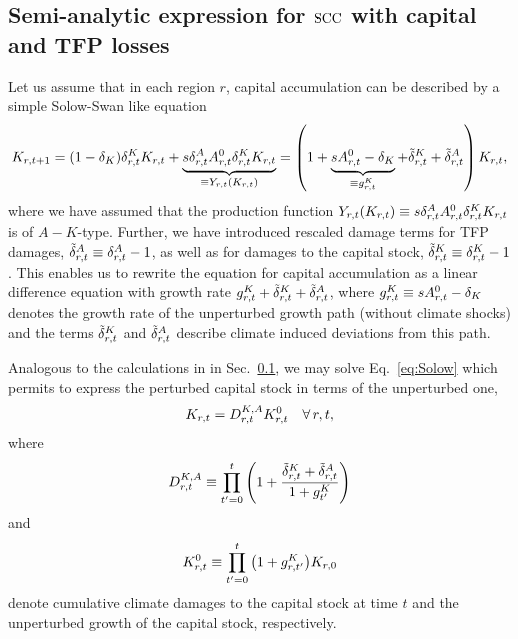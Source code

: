 \documentclass[preprint,3p,authoryear]{elsarticle}
\begin{document}
\subsection{Semi-analytic expression for $\operatorname{SCC}$ with capital and TFP losses}
\label{subsec:analytSCC}
Let us assume that in each region $r$, capital accumulation can be described by a simple Solow-Swan like equation
  \begin{equation}
  \label{eq:Solow}
    K_{r,t+1} = (1-\delta_K)\delta^K_{r,t}K_{r,t}+\underbrace{s\delta^A_{r,t}A^{0}_{r,t}\delta^K_{r,t}K_{r,t}}_{\equiv Y_{r,t}(K_{r,t})}
    = \left(1+\underbrace{sA^{0}_{r,t}-\delta_K}_{\equiv g^{K}_{r,t}} +\tilde{\delta}^K_{r,t}+\tilde{\delta}^A_{r,t}\right)K_{r,t},
  \end{equation}
  where we have assumed that the production function $Y_{r,t}(K_{r,t})\equiv s \delta^A_{r,t}A^{0}_{r,t}\delta^K_{r,t}K_{r,t}$ is of $A-K$-type. Further, we have introduced  rescaled damage terms for TFP damages, $\tilde{\delta}^A_{r,t}\equiv\delta^A_{r,t}-1$, as well as for damages to the capital stock, $\tilde{\delta}^K_{r,t}\equiv\delta^K_{r,t}-1$. This enables us to rewrite the equation for capital accumulation as a linear difference equation with growth rate  $g^{K}_{r,t}+\tilde{\delta}^K_{r,t}+\tilde{\delta}^A_{r,t}$, where $g^{K}_{r,t}\equiv sA^{0}_{r,t}-\delta_K $ denotes the growth rate of the unperturbed growth path (without climate shocks) and the terms $\tilde{\delta}^K_{r,t}$ and $\tilde{\delta}^A_{r,t}$ describe climate induced deviations from this path.

Analogous to the calculations in in Sec.~\ref{subsec:analytSCC}, we may solve Eq.~\eqref{eq:Solow} which permits to express the perturbed capital stock in terms of the unperturbed one,
\begin{equation}
  \label{eq:Solow2}
  K_{r,t}=D^{K,A}_{r,t}K^0_{r,t}\quad\forall\,r,t,
\end{equation}
where
\begin{equation}
  \label{eq:D}
  D^{K,A}_{r,t}\equiv\prod_{t'=0}^{t}\left(1+\frac{\tilde{\delta}^K_{r,t}+\tilde{\delta}^A_{r,t}}{1+g^{K}_{t'}}\right)
\end{equation}
and
\begin{equation}
  \label{eq:YNull}
 K^0_{r,t}\equiv\prod_{t'=0}^{t} \big(1+g^{K}_{r,t'}\big)K_{r,0} 
\end{equation}
 denote cumulative climate damages to the capital stock at time $t$ and the unperturbed growth of the capital stock, respectively.
\end{document}
